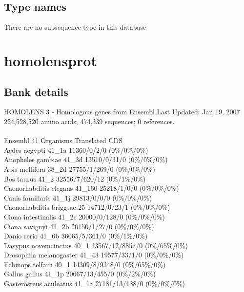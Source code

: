 \documentclass{article}
\begin{document}
\begin{Schunk}
\subsection{Type names}
There are no subsequence type in this database
\section{ homolensprot }
\subsection{Bank details}
HOMOLENS 3 - Homologous genes from Ensembl Last Updated: Jan 19, 2007\\
224,528,520 amino acids; 474,339 sequences; 0 references.\\
\\
Ensembl 41 Organisms Translated CDS\\
Aedes aegypti                           41\_1a 11360/0/2/0 (0\%/0\%/0\%)\\
Anopheles gambiae                       41\_3d 13510/0/31/0 (0\%/0\%/0\%)\\
Apis mellifera                          38\_2d 27755/1/269/0 (0\%/0\%/0\%)\\
Bos taurus                              41\_2 32556/7/620/12 (0\%/1\%/0\%)\\
Caenorhabditis elegans                  41\_160 25218/1/0/0 (0\%/0\%/0\%)\\
Canis familiaris                        41\_1j 29813/0/0/0 (0\%/0\%/0\%)\\
Caenorhabditis briggsae                 25 14712/0/23/1 (0\%/0\%/0\%)\\
Ciona intestinalis                      41\_2c 20000/0/128/0 (0\%/0\%/0\%)\\
Ciona savignyi                          41\_2b 20150/1/27/0 (0\%/0\%/0\%)\\
Danio rerio                             41\_6b 36065/5/361/0 (0\%/1\%/0\%)\\
Dasypus novemcinctus                    40\_1 13567/12/8857/0 (0\%/65\%/0\%)\\
Drosophila melanogaster                 41\_43 19577/33/1/0 (0\%/0\%/0\%)\\
Echinops telfairi                       40\_1 14309/8/9348/0 (0\%/65\%/0\%)\\
Gallus gallus                           41\_1p 20667/13/455/0 (0\%/2\%/0\%)\\
Gasterosteus aculeatus                  41\_1a 27181/13/138/0 (0\%/0\%/0\%)\\

\end{Schunk}
\end{document}
